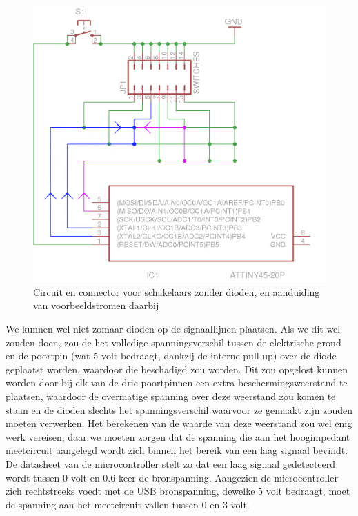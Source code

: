 \documentclass[verslag.tex]{subfiles}
\begin{document}
\begin{figure}
	\includegraphics[width=\textwidth]{afbeeldingen/circuit_schakelaars_foutief}
	\caption{Circuit en connector voor schakelaars zonder dioden, en aanduiding van voorbeeldstromen daarbij}
	\label{fig:circuit_schakelaars_foutief}
\end{figure}

We kunnen wel niet zomaar dioden op de signaallijnen plaatsen. Als we dit wel zouden doen, zou de het volledige spanningsverschil tussen de elektrische grond en de poortpin (wat $5$ volt bedraagt, dankzij de interne pull-up) over de diode geplaatst worden, waardoor die beschadigd zou worden. Dit zou opgelost kunnen worden door bij elk van de drie poortpinnen een extra beschermingsweerstand te plaatsen, waardoor de overmatige spanning over deze weerstand zou komen te staan en de dioden slechts het spanningsverschil waarvoor ze gemaakt zijn zouden moeten verwerken. Het berekenen van de waarde van deze weerstand zou wel enig werk vereisen, daar we moeten zorgen dat de spanning die aan het hoogimpedant meetcircuit aangelegd wordt zich binnen het bereik van een laag signaal bevindt. De datasheet van de microcontroller stelt zo dat een laag signaal gedetecteerd wordt tussen $0$ volt en $0.6$ keer de bronspanning. Aangezien de microcontroller zich rechtstreeks voedt met de USB bronspanning, dewelke $5$ volt bedraagt, moet de spanning aan het meetcircuit vallen tussen $0$ en $3$ volt.
\end{document}

